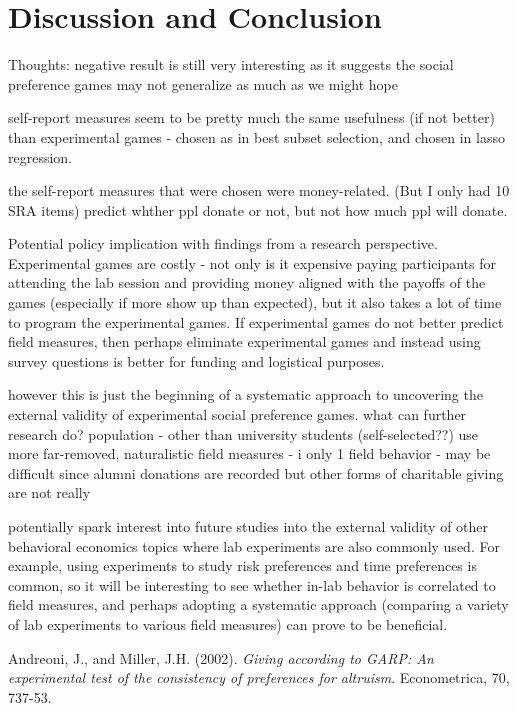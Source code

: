 \documentclass[12pt]{article}
\begin{document}
{\section{Discussion and Conclusion}

Thoughts:
negative result is still very interesting as it suggests the social preference games may not generalize as much as we might hope

self-report measures seem to be pretty much the same usefulness (if not better) than experimental games - chosen as in best subset selection, and chosen in lasso regression.

the self-report measures that were chosen were money-related. (But I only had 10 SRA items)
predict whther ppl donate or not, but not how much ppl will donate.

Potential policy implication with findings from a research perspective. Experimental games are costly - not only is it expensive paying participants for attending the lab session and providing money aligned with the payoffs of the games (especially if more show up than expected), but it also takes a lot of time to program the experimental games. If experimental games do not better predict field measures, then perhaps eliminate experimental games and instead using survey questions is better for funding and logistical purposes. 

however this is just the beginning of a systematic approach to uncovering the external validity of experimental social preference games. what can further research do?
population - other than university students (self-selected??)
use more far-removed, naturalistic field measures - i only 1 field behavior - may be difficult since alumni donations are recorded but other forms of charitable giving are not really

potentially spark interest into future studies into the external validity of other behavioral economics topics where lab experiments are also commonly used. For example, using experiments to study risk preferences and time preferences is common, so it will be interesting to see whether in-lab behavior is correlated to field measures, and perhaps adopting a systematic approach (comparing a variety of lab experiments to various field measures) can prove to be beneficial.


 \newpage
\begin{thebibliography}{9}

Andreoni, J., and Miller, J.H. (2002).
\textit{Giving according to GARP: An experimental test of the consistency of preferences for altruism}.
Econometrica, 70, 737-53.


\end{thebibliography}}
\end{document}
